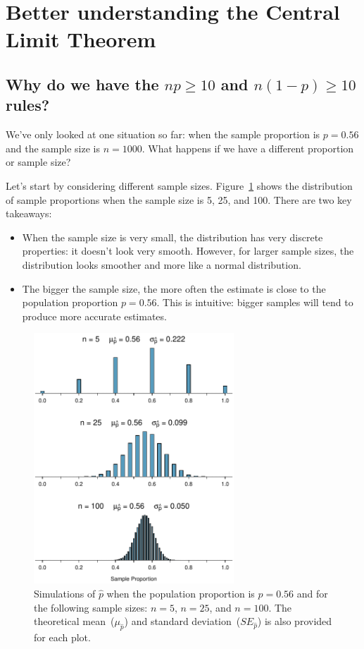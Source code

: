\section{Better understanding the Central Limit Theorem}


\subsection{Why do we have the $np \geq 10$ and
    $n(1-p) \geq 10$ rules?}

We've only looked at one situation so far: when the sample
proportion is $p = 0.56$ and the sample size is $n = 1000$.
What happens if we have a different proportion or sample size?

Let's start by considering different sample sizes.
Figure~\ref{sampling_X_prop_56p} shows the distribution of sample
proportions when the sample size is 5, 25, and 100. There are
two key takeaways:
\begin{itemize}
\item When the sample size is very small, the distribution has
very discrete properties: it doesn't look very smooth. However,
for larger sample sizes, the distribution looks smoother and
more like a normal distribution.
\item The bigger the sample size, the more often the estimate is
close to the population proportion $p = 0.56$. This is intuitive:
bigger samples will tend to produce more accurate estimates.
\end{itemize}

\begin{figure}
   \centering
   \includegraphics[width=0.67\textwidth]{ch_inference_for_props/figures/sampling_X_prop_56p/sampling_X_prop_56p}
   \caption{Simulations of $\hat{p}$ when the population
       proportion is $p = 0.56$ and for the following sample sizes:
       $n = 5$, $n = 25$, and $n = 100$. The theoretical
       mean~($\mu_{\hat{p}}$) and standard
       deviation~($SE_{\hat{p}}$) is also provided for each plot.}
   \label{sampling_X_prop_56p}
\end{figure}

